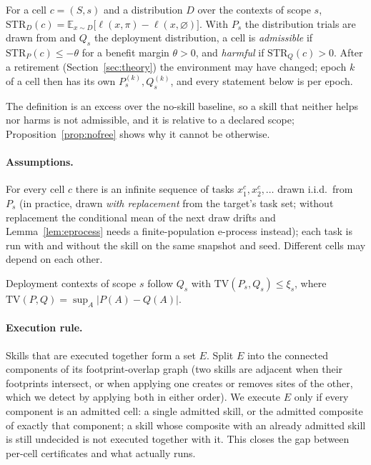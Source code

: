 \begin{definition}
For a cell $c=(S,s)$ and a distribution $D$ over the contexts of scope $s$,
$\mathrm{STR}_{D}(c)=\mathbb{E}_{x\sim D}\bigl[\ell(x,\pi)-\ell(x,\varnothing)\bigr]$.
With $P_s$ the distribution trials are drawn from and $Q_s$ the deployment distribution, a cell is \emph{admissible} if
$\mathrm{STR}_{P}(c)\le-\theta$ for a benefit margin $\theta>0$, and \emph{harmful} if $\mathrm{STR}_{Q}(c)>0$.
After a retirement (Section~\ref{sec:theory}) the environment may have changed; epoch $k$ of a cell then has its own
$P^{(k)}_s,Q^{(k)}_s$, and every statement below is per epoch.
\end{definition}

The definition is an excess over the no-skill baseline, so a skill that neither helps nor harms is not admissible, and it is
relative to a declared scope; Proposition~\ref{prop:nofree} shows why it cannot be otherwise.

\paragraph{Assumptions.}
\begin{assumption}\label{ass:trials}
For every cell $c$ there is an infinite sequence of tasks $x^c_1,x^c_2,\dots$ drawn i.i.d.\ from $P_s$ (in practice, drawn
\emph{with replacement} from the target's task set; without replacement the conditional mean of the next draw drifts and
Lemma~\ref{lem:eprocess} needs a finite-population e-process instead); each task is run with and without the skill on the same snapshot and
seed.  Different cells may depend on each other.
\end{assumption}

\begin{assumption}\label{ass:shift}
Deployment contexts of scope $s$ follow $Q_s$ with $\mathrm{TV}(P_s,Q_s)\le\xi_s$, where
$\mathrm{TV}(P,Q)=\sup_A|P(A)-Q(A)|$.
\end{assumption}

\paragraph{Execution rule.}
Skills that are executed together form a set $E$.  Split $E$ into the connected components of its footprint-overlap graph
(two skills are adjacent when their footprints intersect, or when applying one creates or removes sites of the other, which
we detect by applying both in either order).  We execute $E$ only if every component is an admitted cell: a single admitted
skill, or the admitted composite of exactly that component; a skill whose composite with an already admitted skill is still undecided is not executed together
with it.  This closes the gap between per-cell certificates and what actually runs.

